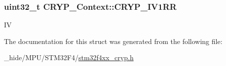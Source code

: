 \subsubsection[{C\+R\+Y\+P\+\_\+\+I\+V1\+R\+R}]{\setlength{\rightskip}{0pt plus 5cm}uint32\+\_\+t C\+R\+Y\+P\+\_\+\+Context\+::\+C\+R\+Y\+P\+\_\+\+I\+V1\+R\+R}\label{struct_c_r_y_p___context_aafdd5ed6c7cafe8f45aabc5401501bf7}
I\+V 

The documentation for this struct was generated from the following file\+:\begin{DoxyCompactItemize}
\item 
\+\_\+hide/\+M\+P\+U/\+S\+T\+M32\+F4/\hyperlink{stm32f4xx__cryp_8h}{stm32f4xx\+\_\+cryp.\+h}\end{DoxyCompactItemize}
